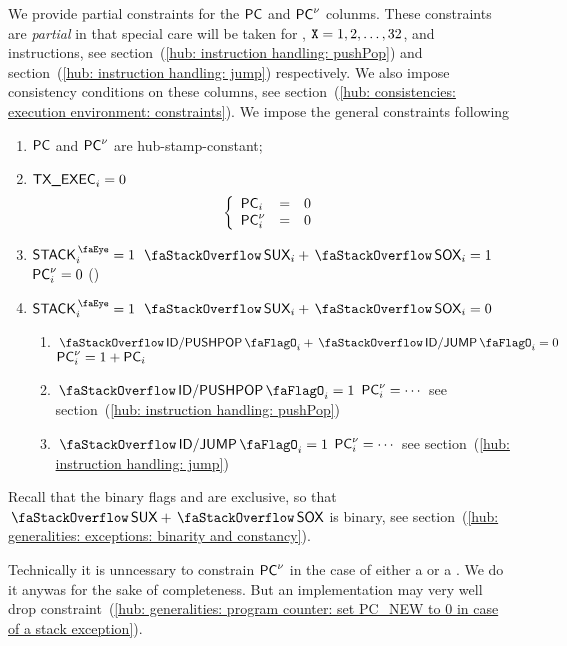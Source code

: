 We provide partial constraints for the $\textsf{PC}$ and $\textsf{PC}^{\nu}$ colunms.
These constraints are \emph{partial} in that special care will be taken for , $\texttt{X} = 1, 2, \dots, 32$, and  instructions, see
section~(\ref{hub: instruction handling: pushPop}) and
section~(\ref{hub: instruction handling: jump}) respectively.
We also impose consistency conditions on these columns, see
section~(\ref{hub: consistencies: execution environment: constraints}).
We impose the general constraints following
\begin{enumerate}
	\item $\textsf{PC}$ and $\textsf{PC}^{\nu}$ are hub-stamp-constant;
	\item \If $\textsf{TX}\textsf{\_EXEC}_{i} = 0$ \Then
		\[
			\left\{ \begin{array}{lcl}
				\textsf{PC}     _{i} & = & 0 \\
				\textsf{PC}^{\nu} _{i} & = & 0 \\
			\end{array} \right.
		\]
	\item \label{hub: generalities: program counter: set PC_NEW to 0 in case of a stack exception}
		\If $\peekStack_{i} = 1$ \et $\stackSux_{i} + \stackSox_{i} = 1$ \Then $\textsf{PC}^{\nu}_{i} = 0$ \quad (\trash)
	\item \If $\peekStack_{i} = 1$ \et $\stackSux_{i} + \stackSox_{i} = 0$
		\begin{enumerate}
			\item \If $\stackDecPushPopFlag_{i} + \stackDecJumpFlag_{i} = 0$ \Then $\textsf{PC}^{\nu}_{i} = 1 + \textsf{PC}_{i}$
			\item \If $\stackDecPushPopFlag_{i}                         = 1$ \Then $\textsf{PC}^{\nu}_{i} = \cdots$ see section~(\ref{hub: instruction handling: pushPop})
			\item \If $                           \stackDecJumpFlag_{i} = 1$ \Then $\textsf{PC}^{\nu}_{i} = \cdots$ see section~(\ref{hub: instruction handling: jump})
		\end{enumerate}
\end{enumerate}
\saNote{}
Recall that the binary flags
\stackSux{} and
\stackSox{}
are exclusive, so that $\stackSux + \stackSox$ is binary,
see section~(\ref{hub: generalities: exceptions: binarity and constancy}).

\saNote{}
Technically it is unncessary to constrain $\textsf{PC}^{\nu}$ in the case of either a \suxSH{} or a \soxSH{}.
We do it anywas for the sake of completeness.
But an implementation may very well drop
constraint~(\ref{hub: generalities: program counter: set PC_NEW to 0 in case of a stack exception}).
